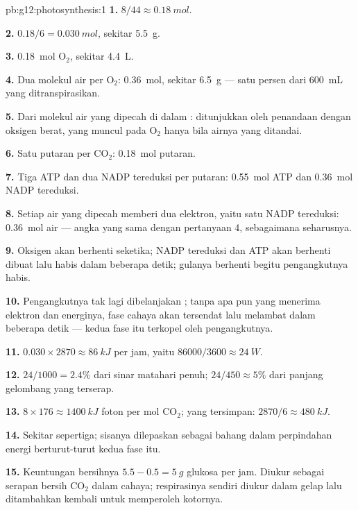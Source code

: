 \begin{solution}{pb:g12:photosynthesis:1}
\textbf{1.} $8/44 \approx \qty{0.18}{mol}$.

\textbf{2.} $0.18/6 = \qty{0.030}{mol}$, sekitar \qty{5.5}{g}.

\textbf{3.} \qty{0.18}{mol} $\mathrm{O_2}$, sekitar \qty{4.4}{L}.

\textbf{4.} Dua molekul air per $\mathrm{O_2}$: \qty{0.36}{mol},
sekitar \qty{6.5}{g} --- satu persen dari \qty{600}{mL} yang ditranspirasikan.

\textbf{5.} Dari molekul air yang dipecah di dalam : ditunjukkan
oleh penandaan dengan oksigen berat, yang muncul pada $\mathrm{O_2}$
hanya bila airnya yang ditandai.

\textbf{6.} Satu putaran per $\mathrm{CO_2}$: \qty{0.18}{mol} putaran.

\textbf{7.} Tiga ATP dan dua NADP tereduksi per putaran: \qty{0.55}{mol}
ATP dan \qty{0.36}{mol} NADP tereduksi.

\textbf{8.} Setiap air yang dipecah memberi dua elektron, yaitu satu
NADP tereduksi: \qty{0.36}{mol} air --- angka yang sama dengan
pertanyaan 4, sebagaimana seharusnya.

\textbf{9.} Oksigen akan berhenti seketika; NADP tereduksi dan ATP akan
berhenti dibuat lalu habis dalam beberapa detik; gulanya berhenti
begitu pengangkutnya habis.

\textbf{10.} Pengangkutnya tak lagi dibelanjakan ; tanpa
apa pun yang menerima elektron dan energinya, fase cahaya akan
tersendat lalu melambat dalam beberapa detik --- kedua fase itu
terkopel oleh pengangkutnya.

\textbf{11.} $0.030 \times 2870 \approx \qty{86}{kJ}$ per jam, yaitu
$86000/3600 \approx \qty{24}{W}$.

\textbf{12.} $24/1000 = 2.4\%$ dari sinar matahari penuh; $24/450 \approx
5\%$ dari panjang gelombang yang terserap.

\textbf{13.} $8 \times 176 \approx \qty{1400}{kJ}$ foton per mol
$\mathrm{CO_2}$; yang tersimpan: $2870/6 \approx \qty{480}{kJ}$.

\textbf{14.} Sekitar sepertiga; sisanya dilepaskan sebagai bahang
dalam perpindahan energi berturut-turut kedua fase itu.

\textbf{15.} Keuntungan bersihnya $5.5 - 0.5 = \qty{5}{g}$ glukosa per
jam. Diukur sebagai serapan bersih $\mathrm{CO_2}$ dalam cahaya;
respirasinya sendiri diukur dalam gelap lalu ditambahkan kembali untuk
memperoleh  kotornya.


\end{solution}

